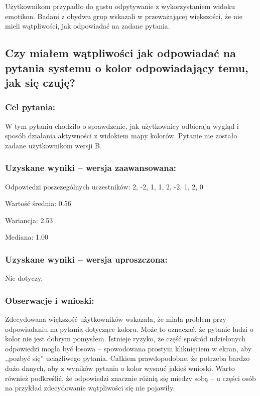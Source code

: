 	Użytkownikom przypadło do gustu odpytywanie z wykorzystaniem widoku emotikon. Badani z obydwu grup wskazali w przeważającej większości, że nie mieli wątpliwości, jak odpowiadać na zadane pytania.
	
	
	\subsection{Czy miałem wątpliwości jak odpowiadać na pytania systemu o kolor odpowiadający temu, jak się czuję?}
	
	\subsubsection{Cel pytania:}
	
	W tym pytaniu chodziło o sprawdzenie, jak użytkownicy odbierają wygląd i sposób działania aktywności z widokiem mapy kolorów. Pytanie nie zostało zadane użytkownikom wersji B.
	
	\subsubsection{Uzyskane wyniki -- wersja zaawansowana:}
	
	Odpowiedzi poszczególnych uczestników: 2, -2, 1, 1, 2, -2, 1, 2, 0
	
	Wartość średnia: 0.56
	
	Wariancja: 2.53
	
	Mediana: 1.00
	
	\subsubsection{Uzyskane wyniki -- wersja uproszczona:}
	
	Nie dotyczy.
	
	\subsubsection{Obserwacje i wnioski:}
	
	Zdecydowana większość użytkowników wskazała, że miała problem przy odpowiadaniu na pytania dotyczące koloru. Może to oznaczać, że pytanie ludzi o kolor nie jest dobrym pomysłem. Istnieje ryzyko, że część spośród udzielonych odpowiedzi mogła być losowa -- spowodowana prostym kliknięciem w ekran, aby ,,pozbyć się'' uciążliwego pytania. Całkiem prawdopodobne, że potrzeba bardzo dużo danych, aby z wyników pytania o kolor wysnuć jakieś wnioski. Warto również podkreślić, że odpowiedzi znacznie różnią się miedzy sobą -- u części osób na przykład zdecydowanie wątpliwości się nie pojawiły.



